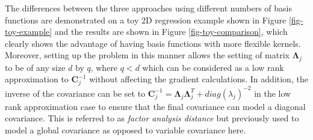 \documentclass[useAMS,usenatbib,fleqn]{mn2e}
\newcommand{\bm}[1]{\mathbf{#1} }
\begin{document}
The differences between the three approaches using different numbers of basis functions are demonstrated on a toy 2D regression example shown in Figure \ref{fig-toy-example} and the results are shown in Figure \ref{fig-toy-comparison}, which clearly shows the advantage of having basis functions with more flexible kernels. Moreover, setting up the problem in this manner allows the setting of matrix $\bm{\Lambda}_{j}$ to be of any size $d$ by $q$, where $q<d$ which can be considered as a low rank approximation to $\bm{C}_{j}^{-1}$ without affecting the gradient calculations. In addition, the inverse of the covariance can be set to  $\bm{C}_{j}^{-1}=\bm{\Lambda}_{j}\bm{\Lambda}_{j}^{T}+diag(\lambda_{j})^{-2}$ in the low rank approximation case to ensure that the final covariance can model a diagonal covariance. This is referred to as \emph{factor analysis distance} \citep[p. 107]{rasmussen2006gaussian}  but previously used to model a global covariance as opposed to variable covariance here.
\end{document}

